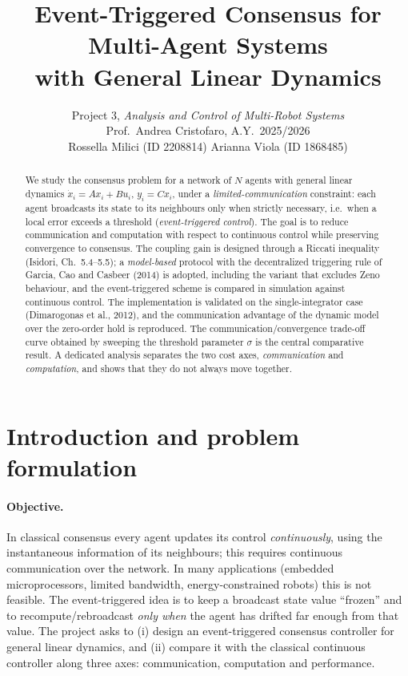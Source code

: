 \documentclass[11pt,a4paper]{article}
\title{\textbf{Event-Triggered Consensus for Multi-Agent Systems\\ with General Linear Dynamics}}
\author{Project 3, \emph{Analysis and Control of Multi-Robot Systems}\\
Prof.\ Andrea Cristofaro, A.Y.\ 2025/2026\\[4pt]
Rossella Milici (ID 2208814) \quad Arianna Viola (ID 1868485)}
\date{}
\theoremstyle{remark}
\begin{document}
\maketitle

\begin{abstract}
\noindent We study the consensus problem for a network of $N$ agents with general linear
dynamics $\dot x_i = Ax_i + Bu_i$, $y_i = Cx_i$, under a \emph{limited-communication}
constraint: each agent broadcasts its state to its neighbours only when strictly necessary,
i.e.\ when a local error exceeds a threshold (\emph{event-triggered control}). The goal is to
reduce communication and computation with respect to continuous control while preserving
convergence to consensus. The coupling gain is designed through a Riccati inequality
(Isidori, Ch.~5.4--5.5); a \emph{model-based} protocol with the decentralized triggering rule of
Garcia, Cao and Casbeer (2014) is adopted, including the variant that excludes Zeno behaviour,
and the event-triggered scheme is compared in simulation against continuous control. The
implementation is validated on the single-integrator case (Dimarogonas et al., 2012), and the
communication advantage of the dynamic model over the zero-order hold is reproduced. The
communication/convergence trade-off curve obtained by sweeping the threshold parameter
$\sigma$ is the central comparative result. A dedicated analysis separates the two cost axes,
\emph{communication} and \emph{computation}, and shows that they do not always move together.
\end{abstract}

\section{Introduction and problem formulation}

\paragraph{Objective.} In classical consensus every agent updates its control \emph{continuously},
using the instantaneous information of its neighbours; this requires continuous communication over
the network. In many applications (embedded microprocessors, limited bandwidth, energy-constrained
robots) this is not feasible. The event-triggered idea is to keep a broadcast state value
``frozen'' and to recompute/rebroadcast \emph{only when} the agent has drifted far enough from that
value. The project asks to (i) design an event-triggered consensus controller for general linear
dynamics, and (ii) compare it with the classical continuous controller along three axes:
communication, computation and performance.
\end{document}
